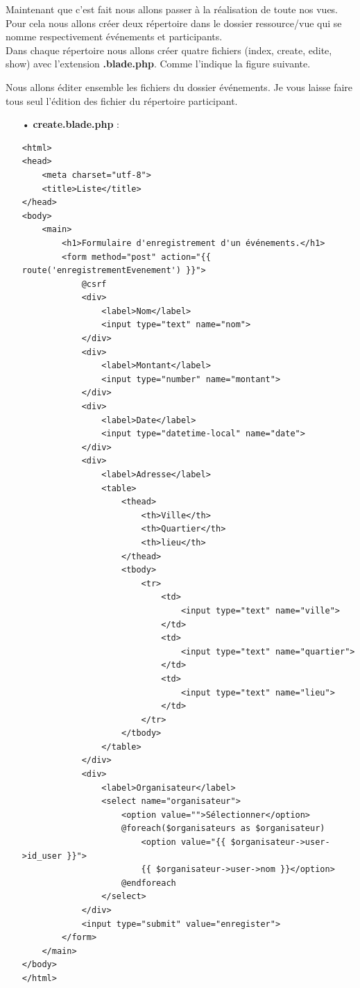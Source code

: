 \documentclass[12pt,a4paper]{article}
\begin{document}
Maintenant que c'est fait nous allons passer à la réalisation de toute nos vues. Pour cela nous allons
créer deux répertoire dans le dossier ressource/vue qui se nomme respectivement événements et participants.\\
Dans chaque répertoire nous allons créer quatre fichiers (index, create, edite, show) avec l’extension \textbf{.blade.php}. Comme l'indique la figure suivante.

Nous allons éditer ensemble les fichiers du dossier événements. Je vous laisse faire tous seul l'édition
des fichier du répertoire participant.

\begin{itemize}
\item[•] \textbf{create.blade.php} :
\begin{verbatim}
<html>
<head>
    <meta charset="utf-8">
    <title>Liste</title>
</head>
<body>
    <main>
        <h1>Formulaire d'enregistrement d'un événements.</h1>
        <form method="post" action="{{ route('enregistrementEvenement') }}">
            @csrf
            <div>
                <label>Nom</label>
                <input type="text" name="nom">
            </div>
            <div>
                <label>Montant</label>
                <input type="number" name="montant">
            </div>
            <div>
                <label>Date</label>
                <input type="datetime-local" name="date">
            </div>
            <div>
                <label>Adresse</label>
                <table>
                    <thead>
                        <th>Ville</th>
                        <th>Quartier</th>
                        <th>lieu</th>
                    </thead>
                    <tbody>
                        <tr>
                            <td>
                                <input type="text" name="ville">
                            </td>
                            <td>
                                <input type="text" name="quartier">
                            </td>
                            <td>
                                <input type="text" name="lieu">
                            </td>
                        </tr>
                    </tbody>
                </table>
            </div>
            <div>
                <label>Organisateur</label>
                <select name="organisateur">
                    <option value="">Sélectionner</option>
                    @foreach($organisateurs as $organisateur)
                        <option value="{{ $organisateur->user->id_user }}">
                        {{ $organisateur->user->nom }}</option>
                    @endforeach
                </select>
            </div>
            <input type="submit" value="enregister">
        </form>
    </main>
</body>
</html>


\end{verbatim}
\end{itemize}
\end{document}
